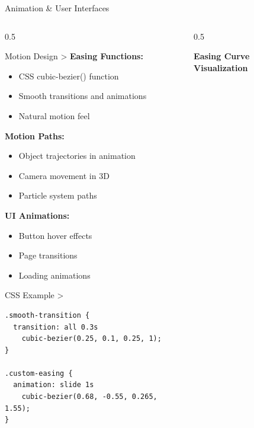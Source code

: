 \begin{frame}[fragile]{Animation \& User Interfaces}
  \begin{columns}
    \begin{column}{0.5\textwidth}
      \begin{conceptbox}{Motion Design}
        \footnotesize>
        \textbf{Easing Functions:}
        \begin{itemize}
          \item CSS cubic-bezier() function
          \item Smooth transitions and animations
          \item Natural motion feel
        \end{itemize}

        \textbf{Motion Paths:}
        \begin{itemize}
          \item Object trajectories in animation
          \item Camera movement in 3D
          \item Particle system paths
        \end{itemize}

        \textbf{UI Animations:}
        \begin{itemize}
          \item Button hover effects
          \item Page transitions
          \item Loading animations
        \end{itemize}
      \end{conceptbox}

      \begin{conceptbox}{CSS Example}
        \scriptsize>
        \begin{verbatim}
.smooth-transition {
  transition: all 0.3s
    cubic-bezier(0.25, 0.1, 0.25, 1);
}

.custom-easing {
  animation: slide 1s
    cubic-bezier(0.68, -0.55, 0.265, 1.55);
}
        \end{verbatim}
      \end{conceptbox}
    \end{column}
    \begin{column}{0.5\textwidth}
      \begin{center}
        \textbf{Easing Curve Visualization}

\end{center}
\end{column}
\end{columns}
\end{frame}
